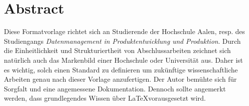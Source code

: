 \chapter*{Abstract}
	\label{chap:abstract}
	Diese Formatvorlage richtet sich an Studierende der Hochschule Aalen, resp. des Studiengangs \emph{Datenmanagement in Produktentwicklung und Produktion}. Durch die Einheitlichkeit und Strukturiertheit von Abschlussarbeiten zeichnet sich natürlich auch das Markenbild einer Hochschule oder Universität aus. Daher ist es wichtig, solch einen Standard zu definieren um zukünftige wissenschaftliche Arbeiten genau nach dieser Vorlage anzufertigen. Der Autor bemühte sich für Sorgfalt und eine angemessene Dokumentation. Dennoch sollte angemerkt werden, dass grundlegendes Wissen über \LaTeX vorausgesetzt wird.